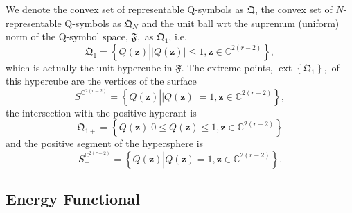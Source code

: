 \documentclass[aps,preprint]{revtex4}%
\begin{document}
We denote the convex set of representable Q-symbols as $\mathfrak{Q}$, the
convex set of $N$-representable Q-symbols as $\mathfrak{Q}_{N}$ and the unit
ball wrt the supremum (uniform) norm of the Q-symbol space, $\mathfrak{F},$ as
$\mathfrak{Q}_{1}$, i.e.
\begin{equation}
\mathfrak{Q}_{1}=\left\{  Q\left(  \mathbf{z}\right)  \left\vert \left\vert
Q\left(  \mathbf{z}\right)  \right\vert \leq1,\mathbf{z\in}\mathbb{C}%
^{2\left(  r-2\right)  }\right.  \right\}  ,
\end{equation}
which is actually the unit hypercube in $\mathfrak{F}$. The extreme points,
$\operatorname*{ext}\left\{  \mathfrak{Q}_{1}\right\}  ,$ of this hypercube
are the vertices of the surface
\begin{equation}
S^{\mathbb{C}^{2\left(  r-2\right)  }}=\left\{  Q\left(  \mathbf{z}\right)
\left\vert \left\vert Q\left(  \mathbf{z}\right)  \right\vert =1,\mathbf{z\in
}\mathbb{C}^{2\left(  r-2\right)  }\right.  \right\}  ,
\end{equation}
the intersection with the positive hyperant is
\begin{equation}
\mathfrak{Q}_{1+}=\left\{  Q\left(  \mathbf{z}\right)  \left\vert 0\leq
Q\left(  \mathbf{z}\right)  \leq1,\mathbf{z\in}\mathbb{C}^{2\left(
r-2\right)  }\right.  \right\}
\end{equation}
and the positive segment of the hypersphere is
\begin{equation}
S_{+}^{\mathbb{C}^{2\left(  r-2\right)  }}=\left\{  Q\left(  \mathbf{z}%
\right)  \left\vert Q\left(  \mathbf{z}\right)  =1,\mathbf{z\in}%
\mathbb{C}^{2\left(  r-2\right)  }\right.  \right\}  .
\end{equation}


\subsection{Energy Functional}
\end{document}
